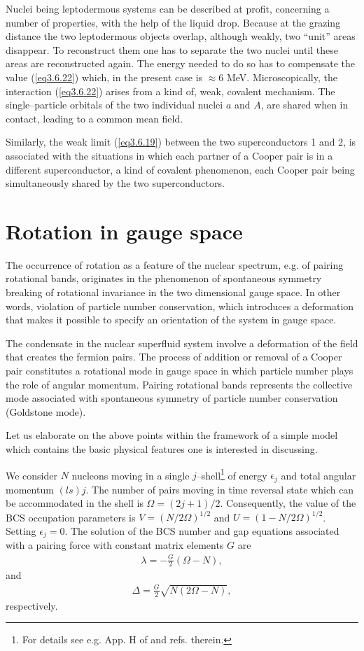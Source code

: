   Nuclei being leptodermous systems can be described at profit, concerning a number of properties, with the help of the liquid drop. Because at the grazing distance the two leptodermous objects overlap, although weakly, two ``unit'' areas disappear. To reconstruct them one has to separate the two nuclei until these areas are reconstructed again. The energy needed to do so has to compensate the value (\ref{eq3.6.22}) which, in the present case  is $\approx$6 MeV. Microscopically, the interaction (\ref{eq3.6.22}) arises from a kind of, weak, covalent mechanism. The single--particle orbitals of the two individual nuclei $a$ and $A$, are shared when in contact, leading to a common mean field.
 
 
 Similarly, the weak limit (\ref{eq3.6.19}) between the two superconductors 1 and 2, is associated with the situations in which each partner of a Cooper pair is in a different superconductor, a kind of covalent phenomenon, each Cooper pair being simultaneously shared by the two superconductors.  
\section{Rotation in gauge space}\label{S3.7}
The occurrence of rotation as a feature of the nuclear spectrum, e.g. of pairing rotational bands, originates in the phenomenon of spontaneous symmetry breaking of rotational invariance in the two dimensional gauge space. In other words, violation of particle number conservation, which introduces a deformation that makes it possible to specify an orientation of the system in gauge space.


The condensate in the nuclear superfluid system involve a deformation of the field that creates the fermion pairs. The process of addition or removal of a Cooper pair constitutes a rotational mode in gauge space in which particle number plays the role of angular momentum. Pairing rotational bands represents the collective mode associated with spontaneous symmetry of particle number conservation (Goldstone mode).


Let us elaborate on the above points within the framework of a simple model which contains the basic physical features one is interested in discussing.


We consider $N$ nucleons moving in a single $j$--shell\footnote{For details see e.g. App. H of \cite{Brink:05} and refs. therein.} of energy $\epsilon_j$ and total angular momentum $(ls)j$. The number of pairs moving in time reversal state which can be accommodated in the shell is $\Omega=(2j+1)/2$. Consequently, the value of the BCS occupation parameters is $V=(N/2\Omega)^{1/2}$ and $U=(1-N/2\Omega)^{1/2}$. Setting $\epsilon_j=0$. The solution of the BCS number and gap equations associated with a pairing force with constant matrix elements $G$ are
  \begin{align}\label{eq3.7.1}
  \lambda=-\frac{G}{2}(\Omega-N),
  \end{align}
  and
  \begin{align}\label{eq3.7.2}
\Delta=\frac{G}{2}\sqrt{N(2\Omega-N)},
  \end{align}
respectively.



